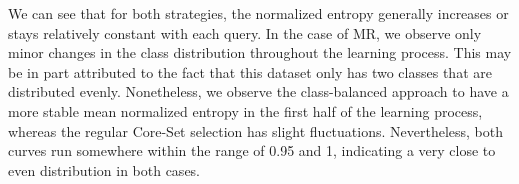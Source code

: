 \documentclass[english,bachelor,ul]{webisthesis} %
\begin{document}

We can see that for both strategies, the normalized entropy generally increases or stays relatively constant with each query. In the case of MR, we observe only minor changes in the class distribution throughout the learning process. This may be in part attributed to the fact that this dataset only has two classes that are distributed evenly. Nonetheless, we observe the class-balanced approach to have a more stable mean normalized entropy in the first half of the learning process, whereas the regular Core-Set selection has slight fluctuations. Nevertheless, both curves run somewhere within the range of 0.95 and 1, indicating a very close to even distribution in both cases. 
\end{document}
